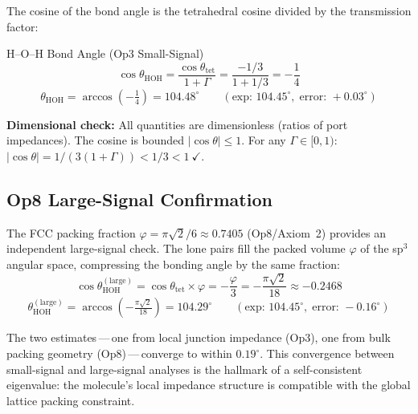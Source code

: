 The cosine of the bond angle is the tetrahedral cosine divided by 
the transmission factor:
\begin{resultbox}{H--O--H Bond Angle (Op3 Small-Signal)}
\begin{equation}
  \cos\theta_\text{HOH} = \frac{\cos\theta_\text{tet}}{1 + \Gamma} 
  = \frac{-1/3}{1 + 1/3} = -\frac{1}{4}
  \label{eq:theta_HOH}
\end{equation}
\begin{equation}
  \theta_\text{HOH} = \arccos\!\left(-\tfrac{1}{4}\right) = 104.48^{\circ}
  \qquad (\text{exp: } 104.45^{\circ}, \;\text{error: } +0.03^{\circ})
\end{equation}
\end{resultbox}

\noindent\textbf{Dimensional check:} All quantities are dimensionless (ratios 
of port impedances). The cosine is bounded $|\cos\theta| \leq 1$. 
For any $\Gamma \in [0, 1)$: $|\cos\theta| = 1/(3(1+\Gamma)) < 1/3 < 1\ \checkmark$.

\subsection{Op8 Large-Signal Confirmation}

The FCC packing fraction $\varphi = \pi\sqrt{2}/6 \approx 0.7405$ (Op8/Axiom~2) 
provides an independent large-signal check. The lone pairs fill the packed 
volume $\varphi$ of the sp$^3$ angular space, compressing the bonding angle by 
the same fraction:
\begin{equation}
  \cos\theta_\text{HOH}^{(\text{large})} = \cos\theta_\text{tet} \times \varphi
  = -\frac{\varphi}{3} = -\frac{\pi\sqrt{2}}{18} \approx -0.2468
  \label{eq:theta_HOH_large}
\end{equation}
\begin{equation}
  \theta_\text{HOH}^{(\text{large})} = \arccos\!\left(-\tfrac{\pi\sqrt{2}}{18}\right) 
  = 104.29^{\circ} \qquad (\text{exp: } 104.45^{\circ}, \;\text{error: } -0.16^{\circ})
\end{equation}

The two estimates\,---\,one from local junction impedance (Op3), one from 
bulk packing geometry (Op8)\,---\,converge to within $0.19^{\circ}$. This 
convergence between small-signal and large-signal analyses is the hallmark of 
a self-consistent eigenvalue: the molecule's local impedance structure is 
compatible with the global lattice packing constraint.

